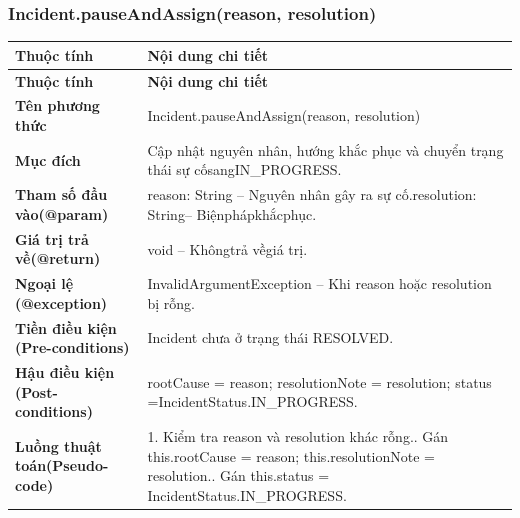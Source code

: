 \subsubsection{Incident.pauseAndAssign(reason, resolution)}
\begin{longtable}{|L{0.24\textwidth}|L{0.70\textwidth}|}
\hline
\textbf{Thuộc tính} & \textbf{Nội dung chi tiết} \\
\hline
\endfirsthead
\hline
\textbf{Thuộc tính} & \textbf{Nội dung chi tiết} \\
\hline
\endhead
\textbf{Tên phương thức} & Incident.pauseAndAssign(reason, resolution) \\
\hline
\textbf{Mục đích} & Cập nhật nguyên nhân, hướng khắc phục và chuyển trạng thái sự cố\newline sangIN\_PROGRESS. \\
\hline
\textbf{Tham số đầu vào}\newline \textbf{(@param)} & reason: String – Nguyên nhân gây ra sự cố.\newline resolution: String– Biệnphápkhắcphục. \\
\hline
\textbf{Giá trị trả về(@return)} & void – Khôngtrả vềgiá trị. \\
\hline
\textbf{Ngoại lệ (@exception)} & InvalidArgumentException – Khi reason hoặc resolution bị rỗng. \\
\hline
\textbf{Tiền điều kiện (Pre-}\newline \textbf{conditions)} & Incident chưa ở trạng thái RESOLVED. \\
\hline
\textbf{Hậu điều kiện (Post-}\newline \textbf{conditions)} & rootCause = reason; resolutionNote = resolution; status =\newline IncidentStatus.IN\_PROGRESS. \\
\hline
\textbf{Luồng thuật toán}\newline \textbf{(Pseudo-code)} & 1. Kiểm tra reason và resolution khác rỗng.. Gán this.rootCause = reason; this.resolutionNote = resolution.. Gán this.status = IncidentStatus.IN\_PROGRESS. \\
\hline
\end{longtable}
\vspace{-0.5\baselineskip}
